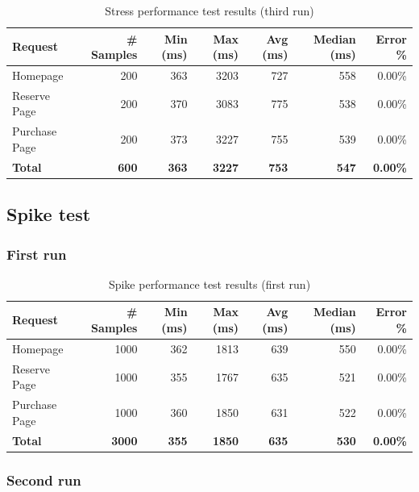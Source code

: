 \documentclass[11pt, leqno, oneside]{article}
\begin{document}
\begin{table}[H]
\centering
\small
\begin{tabularx}{\textwidth}{X r r r r r r}
  \hline
  \textbf{Request} & \textbf{\# Samples} & \textbf{Min (ms)} & \textbf{Max (ms)} & \textbf{Avg (ms)} & \textbf{Median (ms)} & \textbf{Error \%} \\
  \hline
  Homepage      & 200 & 363 & 3203 & 727 & 558 & 0.00\% \\
  Reserve Page  & 200 & 370 & 3083 & 775 & 538 & 0.00\% \\
  Purchase Page & 200 & 373 & 3227 & 755 & 539 & 0.00\% \\
  \hline
  \textbf{Total} & \textbf{600} & \textbf{363} & \textbf{3227} & \textbf{753} & \textbf{547} & \textbf{0.00\%} \\
  \hline
\end{tabularx}
\caption{Stress performance test results (third run)}
\label{tab:stress3}
\end{table}

\subsection{Spike test}

\subsubsection{First run}

\begin{table}[H]
\centering
\small
\begin{tabularx}{\textwidth}{X r r r r r r}
  \hline
  \textbf{Request} & \textbf{\# Samples} & \textbf{Min (ms)} & \textbf{Max (ms)} & \textbf{Avg (ms)} & \textbf{Median (ms)} & \textbf{Error \%} \\
  \hline
  Homepage      & 1000 & 362 & 1813 & 639 & 550 & 0.00\% \\
  Reserve Page  & 1000 & 355 & 1767 & 635 & 521 & 0.00\% \\
  Purchase Page & 1000 & 360 & 1850 & 631 & 522 & 0.00\% \\
  \hline
  \textbf{Total} & \textbf{3000} & \textbf{355} & \textbf{1850} & \textbf{635} & \textbf{530} & \textbf{0.00\%} \\
  \hline
\end{tabularx}
\caption{Spike performance test results (first run)}
\label{tab:spike}
\end{table}

\subsubsection{Second run}
\end{document}
